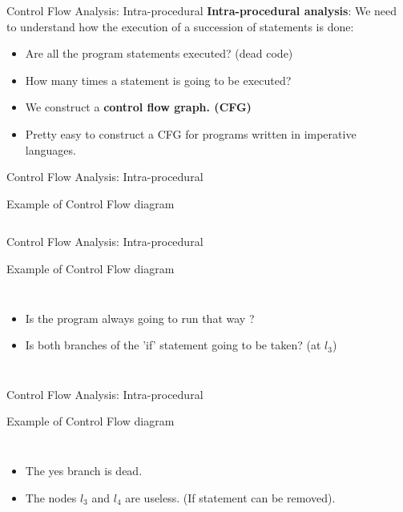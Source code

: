 \begin{frame}{Control Flow Analysis: Intra-procedural}
\textbf{Intra-procedural analysis}: We need to understand how the execution of a succession of statements is done:
\begin{itemize}
	\item Are all the program statements executed? (dead code)
	\item How many times a statement is going to be executed?
	\item We construct a \textbf{control flow graph. (CFG)}
	\item Pretty easy to construct a CFG for programs written in imperative languages.

\end{itemize}
\end{frame}

\begin{frame}{Control Flow Analysis: Intra-procedural}
\begin{exampleblock}{Example of Control Flow diagram}
\begin{columns}
	
	
	
\end{columns}
\end{exampleblock}
\end{frame}


\begin{frame}{Control Flow Analysis: Intra-procedural}
\begin{exampleblock}{Example of Control Flow diagram}
	\begin{columns}
		\footnotesize
		\begin{itemize}
		\item Is the program always going to run that way ?
	    \item Is both branches of the 'if' statement going to be taken? (at $l_3$)
		\end{itemize}
		
	\end{columns}
\end{exampleblock}
\end{frame}


\begin{frame}{Control Flow Analysis: Intra-procedural}
\begin{exampleblock}{Example of Control Flow diagram}
	\begin{columns}
		\column{0.4\linewidth}
		\footnotesize
		\begin{itemize}
			\item The yes branch is dead.
			\item The nodes $l_3$ and $l_4$ are useless. (If statement can be removed).
		\end{itemize}
		
		\column{0.6\linewidth}
		
	\end{columns}
\end{exampleblock}
\end{frame}

